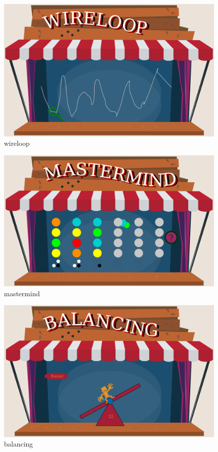 \documentclass{utue} %
\begin{document}
\begin{figure}[]
	\centering
	\includegraphics[width=1.0\textwidth]{images/wireloop.png}
	\caption{wireloop}
	\label{fig:wireloop}
\end{figure}
\begin{figure}[]
	\centering
	\includegraphics[width=1.0\textwidth]{images/mastermind.png}
	\caption{mastermind}
	\label{fig:mastermind}
\end{figure}
\begin{figure}[]
	\centering
	\includegraphics[width=1.0\textwidth]{images/balancing.png}
	\caption{balancing}
	\label{fig:balancing}
\end{figure}
\end{document}
